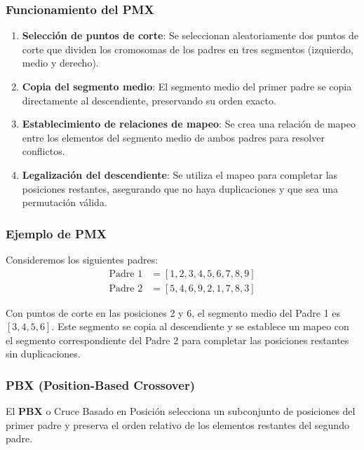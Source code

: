 \subsubsection{Funcionamiento del PMX}

\begin{enumerate}
    \item \textbf{Selección de puntos de corte}: Se seleccionan aleatoriamente dos puntos de corte que dividen los cromosomas de los 
        padres en tres segmentos (izquierdo, medio y derecho).
    
    \item \textbf{Copia del segmento medio}: El segmento medio del primer padre se copia directamente al descendiente, preservando su 
        orden exacto.
    
    \item \textbf{Establecimiento de relaciones de mapeo}: Se crea una relación de mapeo entre los elementos del segmento medio de ambos
         padres para resolver conflictos.
    
    \item \textbf{Legalización del descendiente}: Se utiliza el mapeo para completar las posiciones restantes, asegurando que no haya 
        duplicaciones y que sea una permutación válida.
\end{enumerate}

\subsubsection{Ejemplo de PMX}

Consideremos los siguientes padres:
\begin{align}
\text{Padre 1} &= [1, 2, 3, 4, 5, 6, 7, 8, 9] \\
\text{Padre 2} &= [5, 4, 6, 9, 2, 1, 7, 8, 3]
\end{align}

Con puntos de corte en las posiciones 2 y 6, el segmento medio del Padre 1 es \([3, 4, 5, 6]\). Este segmento se copia al descendiente y se establece un mapeo con el segmento correspondiente del Padre 2 para completar las posiciones restantes sin duplicaciones.

\subsubsection{PBX (Position-Based Crossover)}

El \textbf{PBX} o Cruce Basado en Posición selecciona un subconjunto de posiciones del primer padre y preserva el orden relativo de los elementos restantes del segundo padre.

